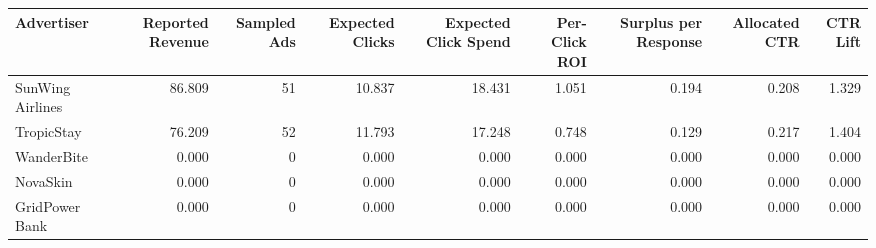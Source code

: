 \begin{tabular}{lrrrrrrrr}
\hline
Advertiser & Reported Revenue & Sampled Ads & Expected Clicks & Expected Click Spend & Per-Click ROI & Surplus per Response & Allocated CTR & CTR Lift \\
\hline
SunWing Airlines & 86.809 & 51 & 10.837 & 18.431 & 1.051 & 0.194 & 0.208 & 1.329 \\
TropicStay & 76.209 & 52 & 11.793 & 17.248 & 0.748 & 0.129 & 0.217 & 1.404 \\
WanderBite & 0.000 & 0 & 0.000 & 0.000 & 0.000 & 0.000 & 0.000 & 0.000 \\
NovaSkin & 0.000 & 0 & 0.000 & 0.000 & 0.000 & 0.000 & 0.000 & 0.000 \\
GridPower Bank & 0.000 & 0 & 0.000 & 0.000 & 0.000 & 0.000 & 0.000 & 0.000 \\
\hline
\end{tabular}
